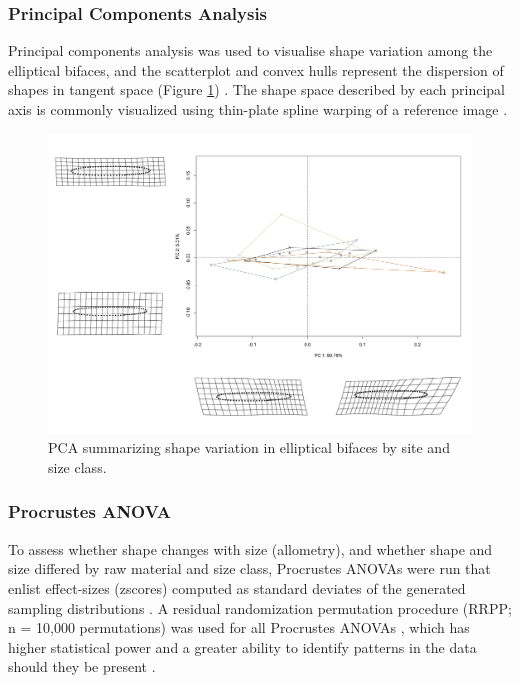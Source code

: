 \documentclass[]{interact}
\theoremstyle{plain}%
\theoremstyle{definition}
\theoremstyle{remark}
\begin{document}
\hypertarget{principal-components-analysis}{%
\subsubsection{Principal Components
Analysis}\label{principal-components-analysis}}

Principal components analysis \citep{RN1746} was used to visualise shape
variation among the elliptical bifaces, and the scatterplot and convex
hulls represent the dispersion of shapes in tangent space (Figure
\ref{fig:pca}) \citep{RN8633,RN5616,RN11143,RN7550}. The shape space
described by each principal axis is commonly visualized using thin-plate
spline warping of a reference image \citep{RN1731,RN479}.

\begin{figure}\centering
\includegraphics[width=\linewidth]{figs/pca.png}
\caption{PCA summarizing shape variation in elliptical bifaces by site and size class. }
\label{fig:pca}
\end{figure}

\hypertarget{procrustes-anova}{%
\subsubsection{Procrustes ANOVA}\label{procrustes-anova}}

To assess whether shape changes with size (allometry), and whether shape
and size differed by raw material and size class, Procrustes ANOVAs
\citep{RN1749} were run that enlist effect-sizes (zscores) computed as
standard deviates of the generated sampling distributions
\citep{RN1756}. A residual randomization permutation procedure (RRPP; n
= 10,000 permutations) was used for all Procrustes ANOVAs
\citep{RN1655,RN11775}, which has higher statistical power and a greater
ability to identify patterns in the data should they be present
\citep{RN1719}.
\end{document}
